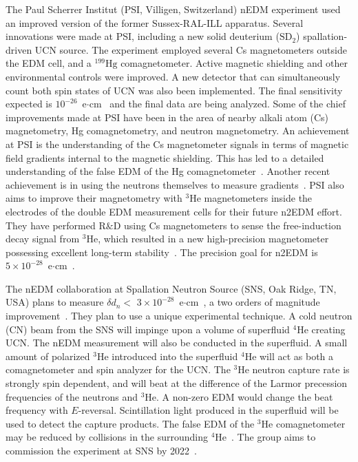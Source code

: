 The Paul Scherrer Institut (PSI, Villigen, Switzerland) nEDM experiment used an improved version of the former Sussex-RAL-ILL apparatus. Several innovations were made at PSI, including a new solid deuterium ($\mathrm{SD_2}$) spallation-driven UCN source. The experiment employed several Cs magnetometers outside the EDM cell, and a $^{199}\mathrm{Hg}$ comagnetometer. Active magnetic shielding and other environmental controls were improved. A new detector that can simultaneously count both spin states of UCN was also been implemented. The final sensitivity expected is $\mathrm{10^{-26}}$~e$\cdot$cm~\cite{psi} and the final data are being analyzed. Some of the chief improvements made at PSI have been in the area of nearby alkali atom (Cs) magnetometry, Hg comagnetometry, and neutron magnetometry. An achievement at PSI is the understanding of the Cs magnetometer signals in terms of magnetic field gradients internal to the magnetic shielding. This has led to a detailed understanding of the false EDM of the Hg comagnetometer~\cite{psi_falseEDM}. Another recent achievement is in using the neutrons themselves to measure gradients~\cite{psi_n_gradient}. PSI also aims to improve their magnetometry with $^3\mathrm{He}$ magnetometers inside the electrodes of the double EDM measurement cells for their future n2EDM effort. They have performed R$\&$D using Cs magnetometers to sense the free-induction decay signal from $^3\mathrm{He}$, which resulted in a new high-precision magnetometer possessing excellent long-term stability~\cite{psi_magnetometer}. The precision goal for n2EDM is $5 \times 10^{-28}$~e$\cdot$cm~\cite{psi_n2edm_nEDM-workshop,psi_n2edm_PPNS-workshop}.

The nEDM collaboration at Spallation Neutron Source (SNS, Oak Ridge, TN, USA) plans to measure $\delta d_n<$ $3\times10^{-28}$~e$\cdot$cm~\cite{sns_nEDM-workshop}, a two orders of magnitude improvement~\cite{sns_lim}. They plan to use a unique experimental technique. A cold neutron (CN) beam from the SNS will impinge upon a volume of superfluid $^4\mathrm{He}$ creating UCN. The nEDM measurement will also be conducted in the superfluid. A small amount of polarized $^3\mathrm{He}$ introduced into the superfluid $^4\mathrm{He}$ will act as both a comagnetometer and spin analyzer for the UCN. The $^3\mathrm{He}$ neutron capture rate is strongly spin dependent, and will beat at the difference of the Larmor precession frequencies of the neutrons and $^3\mathrm{He}$. A non-zero EDM would change the beat frequency with $E$-reversal. Scintillation light produced in the superfluid will be used to detect the capture products. The false EDM of the $^3\mathrm{He}$ comagnetometer may be reduced by collisions in the surrounding $^4\mathrm{He}$~\cite{sns_false_edm}. The group aims to commission the experiment at SNS by 2022~\cite{sns_nEDM-workshop}.

